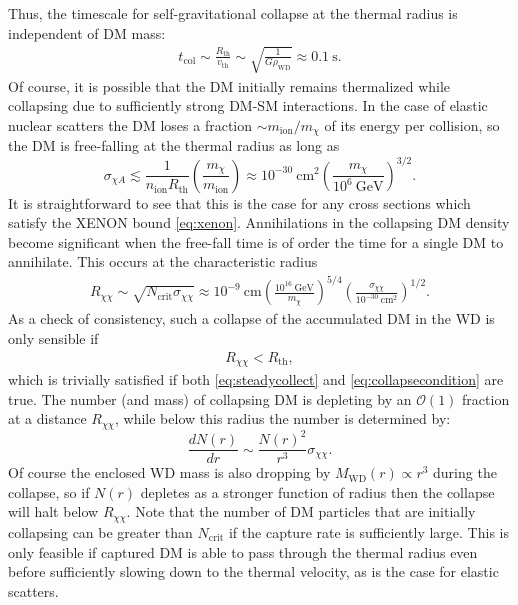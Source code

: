 \documentclass[preprintnumbers,amsmath,amssymb,prd,superscriptaddress]{revtex4}
\newcommand{\OO}{\mathcal{O}}
\newcommand{\GeV}{\text{GeV}}
\newcommand{\cm}{\text{cm}}
\def\r{\right)}
\def\l{\left(}
\begin{document}
Thus, the timescale for self-gravitational collapse at the thermal radius is independent of DM mass:
\begin{align}
\label{eq:collapsetime}
  t_\text{col} \sim \frac{R_\text{th}}{v_\text{th}} \sim \sqrt{\frac{1}{G \rho_\text{WD}}} \approx 0.1 ~\text{s}.
\end{align}
Of course, it is possible that the DM initially remains thermalized while collapsing due to sufficiently strong DM-SM interactions. 
In the case of elastic nuclear scatters the DM loses a fraction $\sim m_\text{ion}/m_\chi$ of its energy per collision, so the DM is free-falling at the thermal radius as long as
\begin{equation}
\sigma_{\chi A} \lesssim \frac{1}{n_\text{ion} R_\text{th}} \l \frac{m_\chi}{m_\text{ion}}\r \approx 10^{-30} ~\cm^2 \l \frac{m_\chi}{10^6 ~\GeV} \r^{3/2}.
\end{equation}
It is straightforward to see that this is the case for any cross sections which satisfy the XENON bound \eqref{eq:xenon}.
Annihilations in the collapsing DM density become significant when the free-fall time is of order the time for a single DM to annihilate.
This occurs at the characteristic radius
\begin{align}
R_{\chi \chi} \sim \sqrt{N_\text{crit} \sigma_{\chi \chi}} \approx 10^{-9} ~\cm  \l \frac{10^{16} ~\GeV}{m_\chi} \r^{5/4} \l \frac{\sigma_{\chi \chi}}{10^{-30} ~\cm^2} \r^{1/2}. 
\end{align}
As a check of consistency, such a collapse of the accumulated DM in the WD is only sensible if
\begin{align}
\label{eq:xicondition}
R_{\chi \chi} < R_\text{th},
\end{align}
which is trivially satisfied if both \eqref{eq:steadycollect} and \eqref{eq:collapsecondition} are true. 
The number (and mass) of collapsing DM is depleting by an $\OO(1)$ fraction at a distance $R_{\chi \chi}$, while below this radius the number is determined by:
\begin{equation}
\frac{dN(r)}{dr} \sim \frac{N(r)^2}{r^3} \sigma_{\chi \chi}.
\end{equation}
Of course the enclosed WD mass is also dropping by $M_\text{WD}(r) \propto r^3$ during the collapse, so if $N(r)$ depletes as a stronger function of radius then the collapse will halt below $R_{\chi \chi}$. 
Note that the number of DM particles that are initially collapsing can be greater than $N_\text{crit}$ if the capture rate is sufficiently large.
This is only feasible if captured DM is able to pass through the thermal radius even before sufficiently slowing down to the thermal velocity, as is the case for elastic scatters. 
\end{document}

